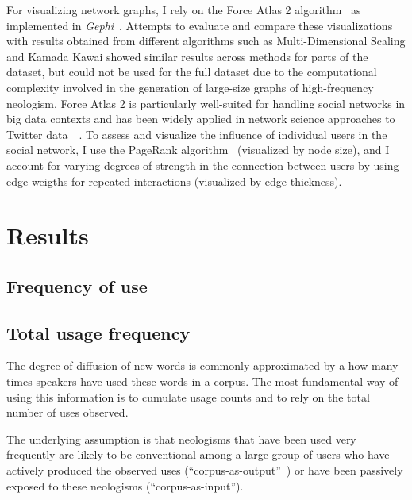 \documentclass[
  a4paper,
  abstract=on,
  captions=tableabove
  ]{scrartcl}
\begin{document}
  For visualizing network graphs, I rely on the Force Atlas 2 algorithm~\parencite{Jacomy2014ForceAtlas2Continuous} as implemented in \emph{Gephi}~\parencite{Bastian2009GephiOpen}. Attempts to evaluate and compare these visualizations with results obtained from different algorithms such as Multi-Dimensional Scaling and Kamada Kawai showed similar results across methods for parts of the dataset, but could not be used for the full dataset due to the computational complexity involved in the generation of large-size graphs of high-frequency neologism. Force Atlas 2 is particularly well-suited for handling social networks in big data contexts and has been widely applied in network science approaches to Twitter data~ \parencite{Bruns2012HowLong,Gerlitz2013MiningOne,Bliss2012TwitterReciprocal}. To assess and visualize the influence of individual users in the social network, I use the PageRank algorithm~\parencite{Brin1998AnatomyLargeScale} (visualized by node size), and I account for varying degrees of strength in the connection between users by using edge weigths for repeated interactions (visualized by edge thickness).

\section{Results}
  \label{sec:results}

  \subsection{Frequency of use}
    \label{subsec:freq}

    \subsection{Total usage frequency}
      \label{subsec:total-freq}

  The degree of diffusion of new words is commonly approximated by a how many times speakers have used these words in a corpus. The most fundamental way of using this information is to cumulate usage counts and to rely on the total number of uses observed.

  The underlying assumption is that neologisms that have been used very frequently are likely to be conventional among a large group of users who have actively produced the observed uses (\enquote{corpus-as-output}~\parencite{Stefanowitsch2017CorpusbasedPerspective}) or have been passively exposed to these neologisms (\enquote{corpus-as-input}).
\end{document}
